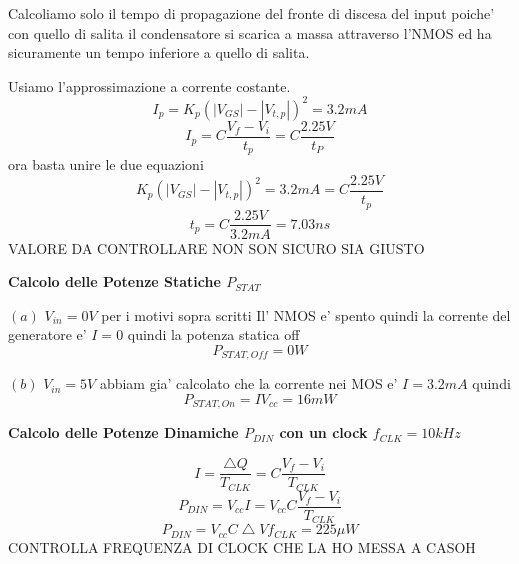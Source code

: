 \documentclass[\main/main.tex]{subfiles}
\begin{document}
Calcoliamo solo il tempo di propagazione del fronte di discesa del input poiche' con quello di salita il condensatore si scarica a massa attraverso l'NMOS ed ha sicuramente un tempo inferiore a quello di salita.

Usiamo l'approssimazione a corrente costante.
\[I_p = K_p \left(|V_{GS}| - |V_{t,p}| \right)^2 = 3.2mA\]
\[I_p = C \frac{V_f - V_i}{t_p} = C \frac{2.25V}{t_P}\]
ora basta unire le due equazioni
\[ K_p \left(|V_{GS}| - |V_{t,p}| \right)^2 = 3.2mA = C \frac{2.25V}{t_p}\]
\[t_p = C \frac{2.25V}{3.2mA} = 7.03ns\]
VALORE DA CONTROLLARE NON SON SICURO SIA GIUSTO

\textbf{Calcolo delle Potenze Statiche $P_{STAT}$}

$(a)$ $V_{in} = 0V$ per i motivi sopra scritti Il' NMOS e' spento quindi la corrente del generatore e' $I = 0$ quindi la potenza statica off
\[P_{STAT,Off} = 0W\]

$(b)$ $V_{in} = 5V$ abbiam gia' calcolato che la corrente nei MOS e' $I = 3.2mA$ quindi
\[ P_{STAT,On} = I V_{cc} = 16mW\]

\textbf{Calcolo delle Potenze Dinamiche $P_{DIN}$ con un clock $f_{CLK} = 10kHz$}

\[ I = \frac{\bigtriangleup Q}{T_{CLK}} = C \frac{V_f - V_i}{T_{CLK}}\]
\[ P_{DIN} = V_{cc} I = V_{cc} C \frac{V_f - V_i}{T_{CLK}}\]
\[ P_{DIN} = V_{cc} C \bigtriangleup V f_{CLK} = 225 \mu W\]
CONTROLLA FREQUENZA DI CLOCK CHE LA HO MESSA A CASOH
\end{document}
